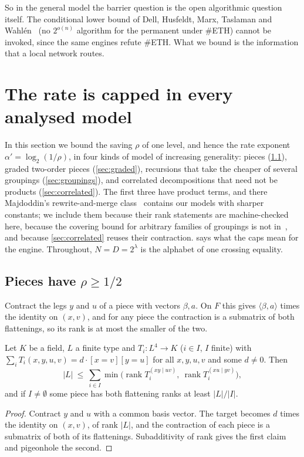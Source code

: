 \documentclass[10pt]{amsart}
\theoremstyle{plain}
\theoremstyle{definition}
\theoremstyle{remark}
\numberwithin{equation}{section}
\newcommand{\rk}{\operatorname{rank}}
\begin{document}
\noindent So in the general model the barrier question is the open algorithmic question itself. The
conditional lower bound of Dell, Husfeldt, Marx, Taslaman and Wahl\'en~\cite{DHMTW14} (no
$2^{o(n)}$ algorithm for the permanent under $\#$ETH) cannot be invoked, since the same engines
refute $\#$ETH. What we bound is the information that a local network routes.

\section{The rate is capped in every analysed model}\label{sec:rate}

In this section we bound the saving $\rho$ of one level, and hence the rate exponent
$\alpha'=\log_2(1/\rho)$, in four kinds of model of increasing generality: pieces (\cref{sec:pieces}),
graded two-order pieces (\cref{sec:graded}), recursions that take the cheaper of several groupings
(\cref{sec:groupings}), and correlated decompositions that need not be products
(\cref{sec:correlated}). The first three have product terms, and there Majdoddin's rewrite-and-merge
class~\cite{Maj26} contains our models with sharper constants; we include them because their rank
statements are machine-checked here, because the covering bound for arbitrary families of groupings is
not in~\cite{Maj26}, and because \cref{sec:correlated} reuses their contraction.  says
what the caps mean for the engine. Throughout, $N=D=2^\lambda$ is the alphabet of one crossing
equality.

\subsection{Pieces have \texorpdfstring{$\rho\ge1/2$}{rho >= 1/2}}\label{sec:pieces}
Contract the legs $y$ and $u$ of a piece with vectors $\beta,a$. On $F$ this gives
$\langle\beta,a\rangle$ times the identity on $(x,v)$, and for any piece the contraction is a submatrix
of both flattenings, so its rank is at most the smaller of the two.

\begin{theorem}\label{thm:pieces}
Let $K$ be a field, $L$ a finite type and $T_i:L^4\to K$ ($i\in I$, $I$ finite) with
$\sum_iT_i(x,y,u,v)=d\cdot[x=v][y=u]$ for all $x,y,u,v$ and some $d\ne0$. Then
\[
  |L|\ \le\ \sum_{i\in I}\min\bigl(\rk T_i^{(xy\mid uv)},\ \rk T_i^{(xu\mid yv)}\bigr),
\]
and if $I\ne\emptyset$ some piece has both flattening ranks at least $|L|/|I|$.
\end{theorem}
\begin{proof}
Contract $y$ and $u$ with a common basis vector. The target becomes $d$ times the identity on $(x,v)$, of
rank $|L|$, and the contraction of each piece is a submatrix of both of its flattenings. Subadditivity of
rank gives the first claim and pigeonhole the second.
\end{proof}
\end{document}

